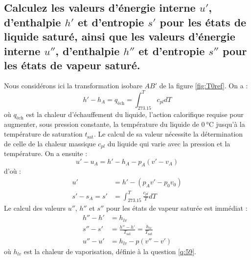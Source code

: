 \subsection{Calculez les valeurs d'énergie interne $u'$, d'enthalpie $h'$ et d'entropie $s'$ pour les états de liquide saturé, ainsi que les valeurs d'énergie interne $u''$, d'enthalpie $h''$ et d'entropie $s''$ pour les états de vapeur saturé.}
Nous considérons ici la transformation isobare $AB'$ de la figure \ref{fig:T0ref}. On a :
\begin{equation} h' - h_A = q_\text{éch} = \int_{273.15}^Tc_{pl}dT \end{equation}
où $q_\text{éch}$ est la chaleur d'échauffement du liquide, l'action calorifique requise pour augmenter, sous pression constante, la température du liquide de $\SI{0}{\celsius}$ jusqu'à la température de saturation $t_\text{sat}$. Le calcul de sa valeur nécessite la détermination de celle de la chaleur massique $c_{pl}$ du liquide qui varie avec la pression et la température.
On a ensuite :
\begin{equation} u' - u_A = h' - h_A - p_A(v'-v_A) \end{equation}
d'où :
\begin{align} u' &= h' - (p_Av' - p_0v_0) \\ s'-s_A = s' &= \int_{273.15}^T\frac{c_{pl}}{T}dT \end{align}
Le calcul des valeurs $u''$, $h''$ et $s''$ pour les états de vapeur saturée est immédiat :
\begin{align} h''-h' &= h_{lv} \\ s''-s' &= \frac{h''-h'}{T_\text{sat}} = \frac{h_{lv}}{T_\text{sat}} \\ u''-u' &= h_{lv} - p(v''-v') \end{align}
où $h_{lv}$ est la chaleur de vaporisation, définie à la question \ref{q:59}.

